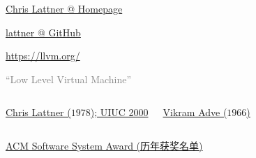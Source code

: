 
\begin{frame}{}
	\begin{center}
		\href{https://www.nondot.org/sabre/}{Chris Lattner @ Homepage}

		\vspace{0.30cm}
		\vspace{0.30cm}

		\href{https://github.com/lattner}{lattner @ GitHub}
	\end{center}
\end{frame}

\begin{frame}{}
	\begin{center}
		\url{https://llvm.org/}

		\vspace{0.50cm}
		\vspace{0.50cm}

		\textcolor{gray}{``Low Level Virtual Machine''}
	\end{center}
\end{frame}

\begin{frame}{}
	\begin{columns}
			\begin{center}
				\href{https://nondot.org/sabre/}{Chris Lattner ($1978$); UIUC 2000}
			\end{center}
			\begin{center}
				\href{https://vikram.cs.illinois.edu/}{Vikram Adve ($1966$)}
			\end{center}
	\end{columns}
\end{frame}

\begin{frame}{}
	\begin{center}

		\vspace{0.80cm}
		\href{https://en.wikipedia.org/wiki/ACM_Software_System_Award}{ACM Software System Award (历年获奖名单)}
	\end{center}
\end{frame}

